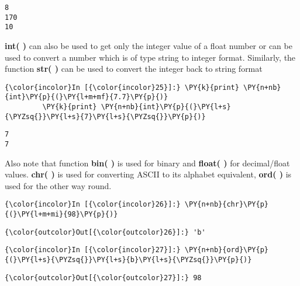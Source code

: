     \begin{Verbatim}[commandchars=\\\{\}]
8
170
10
    \end{Verbatim}

    \textbf{int( )} can also be used to get only the integer value of a
float number or can be used to convert a number which is of type string
to integer format. Similarly, the function \textbf{str( )} can be used
to convert the integer back to string format

    \begin{Verbatim}[commandchars=\\\{\}]
{\color{incolor}In [{\color{incolor}25}]:} \PY{k}{print} \PY{n+nb}{int}\PY{p}{(}\PY{l+m+mf}{7.7}\PY{p}{)}
         \PY{k}{print} \PY{n+nb}{int}\PY{p}{(}\PY{l+s}{\PYZsq{}}\PY{l+s}{7}\PY{l+s}{\PYZsq{}}\PY{p}{)}
\end{Verbatim}

    \begin{Verbatim}[commandchars=\\\{\}]
7
7
    \end{Verbatim}

    Also note that function \textbf{bin( )} is used for binary and
\textbf{float( )} for decimal/float values. \textbf{chr( )} is used for
converting ASCII to its alphabet equivalent, \textbf{ord( )} is used for
the other way round.

    \begin{Verbatim}[commandchars=\\\{\}]
{\color{incolor}In [{\color{incolor}26}]:} \PY{n+nb}{chr}\PY{p}{(}\PY{l+m+mi}{98}\PY{p}{)}
\end{Verbatim}

            \begin{Verbatim}[commandchars=\\\{\}]
{\color{outcolor}Out[{\color{outcolor}26}]:} 'b'
\end{Verbatim}
        
    \begin{Verbatim}[commandchars=\\\{\}]
{\color{incolor}In [{\color{incolor}27}]:} \PY{n+nb}{ord}\PY{p}{(}\PY{l+s}{\PYZsq{}}\PY{l+s}{b}\PY{l+s}{\PYZsq{}}\PY{p}{)}
\end{Verbatim}

            \begin{Verbatim}[commandchars=\\\{\}]
{\color{outcolor}Out[{\color{outcolor}27}]:} 98
\end{Verbatim}
        
